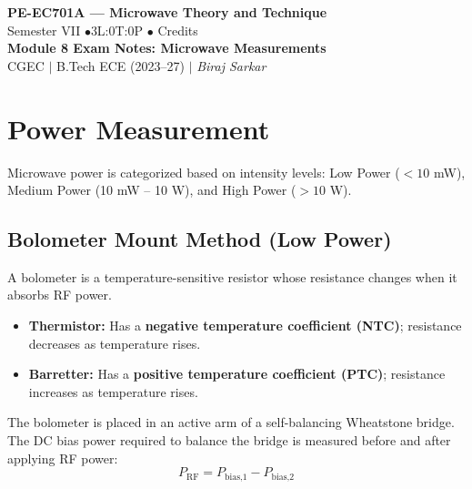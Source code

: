 \documentclass[12pt,a4paper]{article}
\begin{document}

\begin{center}
  {\LARGE\bfseries\color{myred} PE-EC701A --- Microwave Theory and Technique}\\[5pt]
  {\normalsize\color{mydark} Semester VII \quad$\bullet$\quad 3L:0T:0P \quad$\bullet$ Credits}\\[3pt]
  {\normalsize\color{myteal}\textbf{Module 8 Exam Notes: Microwave Measurements}}\\[3pt]
  {\small\color{mydark} CGEC \;$|$\; B.Tech ECE (2023--27) \;$|$\; \textit{Biraj Sarkar}}
\end{center}
\vspace{2pt}
\noindent{\color{myred}\rule{\linewidth}{1.5pt}}
\vspace{2pt}

\hypersetup{linkcolor=mydark}
\tableofcontents
\hypersetup{linkcolor=myteal}
\newpage

\section{Power Measurement}

Microwave power is categorized based on intensity levels: Low Power ($< 10$ mW), Medium Power (10 mW -- 10 W), and High Power ($> 10$ W).

\subsection{Bolometer Mount Method (Low Power)}
A bolometer is a temperature-sensitive resistor whose resistance changes when it absorbs RF power.
\begin{itemize}[leftmargin=*, itemsep=3pt]
  \item \textbf{Thermistor:} Has a \textbf{negative temperature coefficient (NTC)}; resistance decreases as temperature rises.
  \item \textbf{Barretter:} Has a \textbf{positive temperature coefficient (PTC)}; resistance increases as temperature rises.
\end{itemize}
The bolometer is placed in an active arm of a self-balancing Wheatstone bridge. The DC bias power required to balance the bridge is measured before and after applying RF power:
\begin{equation}
  P_{\text{RF}} = P_{\text{bias,1}} - P_{\text{bias,2}}
\end{equation}
\end{document}
